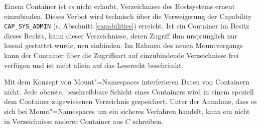 \documentclass[../main.tex]{subfiles}
\begin{document}

			Einem Container ist es nicht erlaubt, Verzeichnisse des Hostsystems erneut einzubinden. Dieses Verbot wird technisch über die Verweigerung der Capability \texttt{CAP\_SYS\_ADMIN} (s. Abschnitt \ref{capabilities}) erreicht. Ist ein Container im Besitz dieses Rechts, kann dieser Verzeichnisse, deren Zugriff ihm ursprünglich nur lesend gestattet wurde, neu einbinden. Im Rahmen des neuen Mountvorgangs kann der Container über die Zugriffsart auf einzubindende Verzeichnisse frei verfügen und ist nicht allein auf das Leserecht beschränkt.



			Mit dem Konzept von Mount"=Namespaces interferieren Daten von Containern nicht. Jede oberste, beschreibbare Schicht eines Containers wird in einem speziell dem Container zugewiesenen Verzeichnis gespeichert. Unter der Annahme, dass es sich bei Mount"=Namespaces um ein sicheres Verfahren handelt, kann ein \cbroken{} nicht in Verzeichnisse anderer Container aus \(C\) schreiben.




\end{document}
